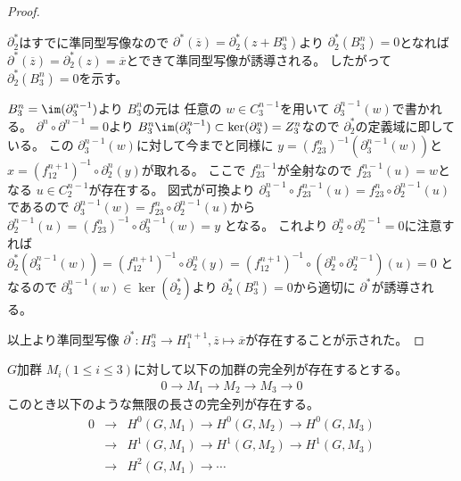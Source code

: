 \documentclass[../master_galois_theory]{subfiles}
\begin{document}
\begin{proof}
\begin{center}
  \end{center}

  $\partial^*_2$はすでに準同型写像なので $\partial^*(\overline{z}) = \partial^*_2(z + B^n_3)$より $\partial^*_2(B^n_3) = 0$となれば
  $\partial^*(\overline{z}) = \partial^*_2(z) = \overline{x}$とできて準同型写像が誘導される。
  したがって $\partial^*_2(B^n_3) = 0$を示す。

  $B^n_3 = \im(\partial^{n-1}_3)$より $B^n_3$の元は
  任意の $w \in C^{n-1}_3$を用いて $\partial^{n-1}_3(w)$で書かれる。
  $\partial^n \circ \partial^{n-1} = 0$より $B^n_3 \im(\partial^{n-1}_3) \subset \ker(\partial^n_3) = Z^n_3$なので $\partial^*_2$の定義域に即している。
  この $\partial^{n-1}_3(w)$に対して今までと同様に
  $y = (f_{23}^n)^{-1}(\partial^{n-1}_3(w))$と
  $x = (f_{12}^{n+1})^{-1} \circ \partial^n_2(y)$が取れる。
  ここで $f_{23}^{n-1}$が全射なので $f_{23}^{n-1}(u) = w$となる $u \in C^{n-1}_2$が存在する。
  図式が可換より $\partial^{n-1}_3 \circ f_{23}^{n-1}(u) = f_{23}^n \circ \partial^{n-1}_2(u)$であるので
  $\partial^{n-1}_3(w) = f_{23}^n \circ \partial^{n-1}_2(u)$から
  $\partial^{n-1}_2(u) = (f_{23}^n)^{-1} \circ \partial^{n-1}_3(w) = y$
  となる。
  これより $\partial^n_2 \circ \partial^{n-1}_2 = 0$に注意すれば
  $\partial^*_2(\partial^{n-1}_3(w)) = (f_{12}^{n+1})^{-1} \circ \partial^n_2(y) = (f_{12}^{n+1})^{-1} \circ (\partial^n_2 \circ \partial^{n-1}_2)(u) = 0$
  となるので $\partial^{n-1}_3(w) \in \ker(\partial^*_2)$より
  $\partial^*_2(B^n_3) = 0$から適切に $\partial^*$が誘導される。

  以上より準同型写像 $\partial^* : H^n_3 \longrightarrow H^{n+1}_1 , \overline{z} \longmapsto \overline{x}$が存在することが示された。
\end{proof}

\begin{fact}
  $G$加群 $M_i (1 \leq i \leq 3)$に対して以下の加群の完全列が存在するとする。
  \begin{eqnarray*}
    0 \longrightarrow M_1 \longrightarrow M_2 \longrightarrow M_3 \longrightarrow 0
  \end{eqnarray*}
  このとき以下のような無限の長さの完全列が存在する。
  \begin{eqnarray*}
    0 & \longrightarrow & H^0(G,M_1) \longrightarrow H^0(G,M_2) \longrightarrow H^0(G,M_3) \\
    & \longrightarrow & H^1(G,M_1) \longrightarrow H^1(G,M_2) \longrightarrow H^1(G,M_3) \\
    & \longrightarrow & H^2(G,M_1) \longrightarrow \cdots
  \end{eqnarray*}
\end{fact}
\end{document}

